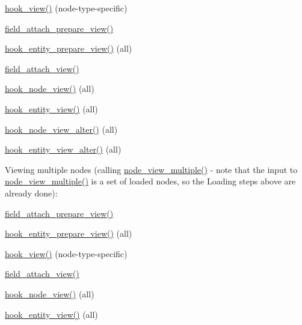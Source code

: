 \begin{DoxyItemize}
\begin{DoxyItemize}
\item \hyperlink{group__node__api__hooks_gab1f229603b5e0f2f9d9e2a3ab53dcbda}{hook\_\-view()} (node-\/type-\/specific)
\item \hyperlink{group__field__attach_ga12b5fce5e2b2adb487c485c63bfe0298}{field\_\-attach\_\-prepare\_\-view()}
\item \hyperlink{group__hooks_ga7e60ef817e60b20497bda315d2f30163}{hook\_\-entity\_\-prepare\_\-view()} (all)
\item \hyperlink{group__field__attach_gaa752a8fd31173fd2308d71eb059e00c7}{field\_\-attach\_\-view()}
\item \hyperlink{group__node__api__hooks_ga475290ee8e81a2373ea17c512cc3f9a9}{hook\_\-node\_\-view()} (all)
\item \hyperlink{group__hooks_gae273ba271c2ef1192fe135afa9da5d49}{hook\_\-entity\_\-view()} (all)
\item \hyperlink{group__node__api__hooks_gad5ece824736be57bf0020af900398b94}{hook\_\-node\_\-view\_\-alter()} (all)
\item \hyperlink{group__hooks_ga2c2be6c70815b426f0eb13b0b68edb40}{hook\_\-entity\_\-view\_\-alter()} (all)
\end{DoxyItemize}
\item Viewing multiple nodes (calling \hyperlink{node_8module_a2296e973f0df6c4c1961891b05c0d5d4}{node\_\-view\_\-multiple()} -\/ note that the input to \hyperlink{node_8module_a2296e973f0df6c4c1961891b05c0d5d4}{node\_\-view\_\-multiple()} is a set of loaded nodes, so the Loading steps above are already done):
\begin{DoxyItemize}
\item \hyperlink{group__field__attach_ga12b5fce5e2b2adb487c485c63bfe0298}{field\_\-attach\_\-prepare\_\-view()}
\item \hyperlink{group__hooks_ga7e60ef817e60b20497bda315d2f30163}{hook\_\-entity\_\-prepare\_\-view()} (all)
\item \hyperlink{group__node__api__hooks_gab1f229603b5e0f2f9d9e2a3ab53dcbda}{hook\_\-view()} (node-\/type-\/specific)
\item \hyperlink{group__field__attach_gaa752a8fd31173fd2308d71eb059e00c7}{field\_\-attach\_\-view()}
\item \hyperlink{group__node__api__hooks_ga475290ee8e81a2373ea17c512cc3f9a9}{hook\_\-node\_\-view()} (all)
\item \hyperlink{group__hooks_gae273ba271c2ef1192fe135afa9da5d49}{hook\_\-entity\_\-view()} (all)

\end{DoxyItemize}
\end{DoxyItemize}
